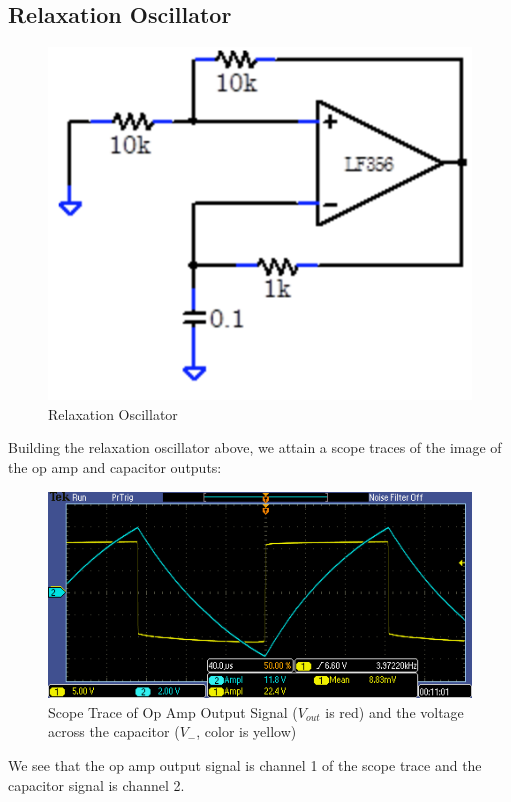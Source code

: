 \documentclass{article}
\begin{document}
    \subsection{Relaxation Oscillator}
    \begin{figure}[H]
        \centering
        \includegraphics[scale = 0.6]{3.png}
        \caption{Relaxation Oscillator \cite{lab7}}
        \label{fig:my_label}
    \end{figure}
    Building the relaxation oscillator above, we attain a scope traces of the image of the op amp and capacitor outputs:
    \begin{figure}[H]
        \centering
        \includegraphics[scale = 0.7]{3a.PNG}
        \caption{Scope Trace of Op Amp Output Signal ($V_{out}$ is red) and the voltage across the capacitor ($V_-$, color is yellow)}
        \label{fig:my_label}
    \end{figure}
    We see that the op amp output signal is channel 1 of the scope trace and the capacitor signal is channel 2.\\\indent
\end{document}

